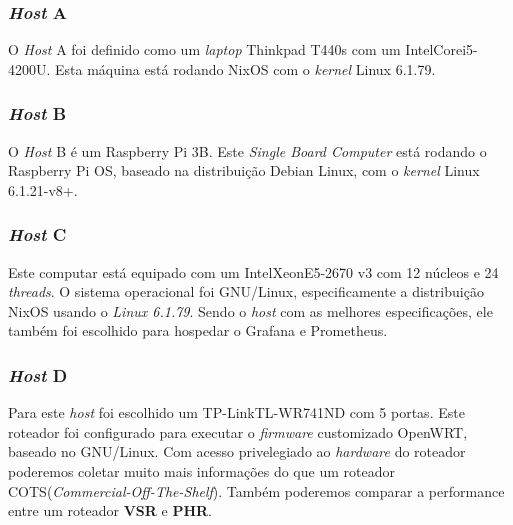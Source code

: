 \documentclass[12pt]{article}
\begin{document}

\subsubsection{\textit{Host} A}
O \textit{Host} A foi definido como um \textit{laptop} Thinkpad T440s com um Intel\textregistered\space Core\texttrademark\space i5-4200U. Esta máquina está rodando NixOS com o \textit{kernel} Linux 6.1.79. %

\subsubsection{\textit{Host} B}
O \textit{Host} B é um Raspberry Pi 3B. Este \textit{Single Board Computer} está rodando o Raspberry Pi OS, baseado na distribuição Debian Linux, com o \textit{kernel} Linux 6.1.21-v8+. %

\subsubsection{\textit{Host} C}
Este computar está equipado com um Intel\textregistered\space Xeon\textregistered\space E5-2670 v3 com 12 núcleos e 24 \textit{threads}.
O sistema operacional foi GNU/Linux, especificamente a distribuição NixOS usando o \textit{Linux 6.1.79}. Sendo o \textit{host} com as melhores especificações, ele também foi escolhido para hospedar o Grafana e Prometheus.


\subsubsection{\textit{Host} D}
Para este \textit{host} foi escolhido um TP-Link\textregistered\space TL-WR741ND com 5 portas. Este roteador foi configurado para executar o \textit{firmware} customizado OpenWRT, baseado no GNU/Linux. Com acesso privelegiado ao \textit{hardware} do roteador poderemos coletar muito mais informações do que um roteador COTS(\textit{Commercial-Off-The-Shelf}). Também poderemos comparar a performance entre um roteador \textbf{VSR} e \textbf{PHR}.
\end{document}
